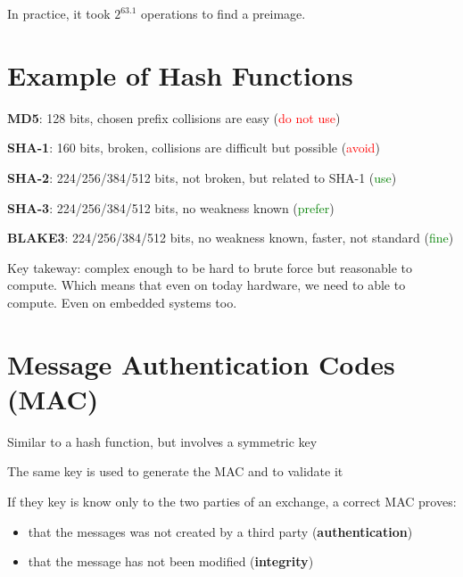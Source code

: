 \documentclass[11pt]{article}
\begin{document}
\begin{tcolorbox}[
  colback=red!15,     %
  colframe=black!50,    %
  boxrule=1pt,       %
  arc=3mm,             %
  left=4mm, right=4mm, top=2mm, bottom=2mm %
]

In practice, it took $2^{63.1}$ operations to find a preimage. 
\end{tcolorbox}

\section*{Example of Hash Functions}

\textbf{MD5}: 128 bits, chosen prefix collisions are easy (\textcolor{red}{do not use})

\textbf{SHA-1}: 160 bits, broken, collisions are difficult but possible
(\textcolor{red}{avoid})

\textbf{SHA-2}: 224/256/384/512 bits, not broken, but related to SHA-1
(\textcolor{green}{use})

\textbf{SHA-3}: 224/256/384/512 bits, no weakness known (\textcolor{green}{prefer})

\textbf{BLAKE3}: 224/256/384/512 bits, no weakness known, faster, not standard (\textcolor{green}{fine})

\begin{tcolorbox}[
  colback=yellow!15,     %
  colframe=black!50,    %
  boxrule=1pt,       %
  arc=3mm,             %
  left=4mm, right=4mm, top=2mm, bottom=2mm %
]
Key takeway: complex enough to be hard to brute force but reasonable to compute. Which means that even on today hardware, we need to able to compute. Even on embedded systems too.  

\end{tcolorbox}

\section*{Message Authentication Codes (MAC)}

Similar to a hash function, but involves a symmetric key

The same key is used to generate the MAC and to validate it

If they key is know only to the two parties of an exchange, a correct MAC proves:

\begin{itemize}
	\item that the messages was not created by a third party (\textbf{authentication})
	\item that the message has not been modified (\textbf{integrity})
\end{itemize}
\end{document}
